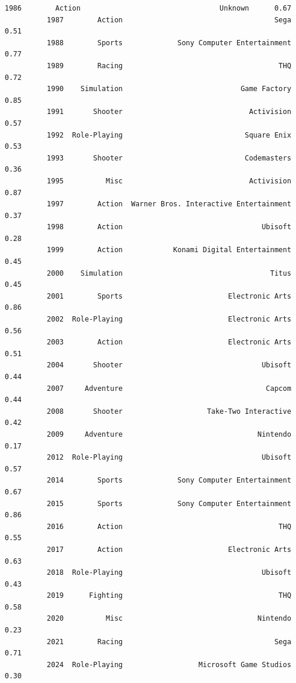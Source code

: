 \documentclass[11pt]{article}
\begin{document}
\begin{Verbatim}[commandchars=\\\{\}]
          1986        Action                                 Unknown      0.67   
          1987        Action                                    Sega      0.51   
          1988        Sports             Sony Computer Entertainment      0.77   
          1989        Racing                                     THQ      0.72   
          1990    Simulation                            Game Factory      0.85   
          1991       Shooter                              Activision      0.57   
          1992  Role-Playing                             Square Enix      0.53   
          1993       Shooter                             Codemasters      0.36   
          1995          Misc                              Activision      0.87   
          1997        Action  Warner Bros. Interactive Entertainment      0.37   
          1998        Action                                 Ubisoft      0.28   
          1999        Action            Konami Digital Entertainment      0.45   
          2000    Simulation                                   Titus      0.45   
          2001        Sports                         Electronic Arts      0.86   
          2002  Role-Playing                         Electronic Arts      0.56   
          2003        Action                         Electronic Arts      0.51   
          2004       Shooter                                 Ubisoft      0.44   
          2007     Adventure                                  Capcom      0.44   
          2008       Shooter                    Take-Two Interactive      0.42   
          2009     Adventure                                Nintendo      0.17   
          2012  Role-Playing                                 Ubisoft      0.57   
          2014        Sports             Sony Computer Entertainment      0.67   
          2015        Sports             Sony Computer Entertainment      0.86   
          2016        Action                                     THQ      0.55   
          2017        Action                         Electronic Arts      0.63   
          2018  Role-Playing                                 Ubisoft      0.43   
          2019      Fighting                                     THQ      0.58   
          2020          Misc                                Nintendo      0.23   
          2021        Racing                                    Sega      0.71   
          2024  Role-Playing                  Microsoft Game Studios      0.30   
          

\end{Verbatim}
\end{document}
